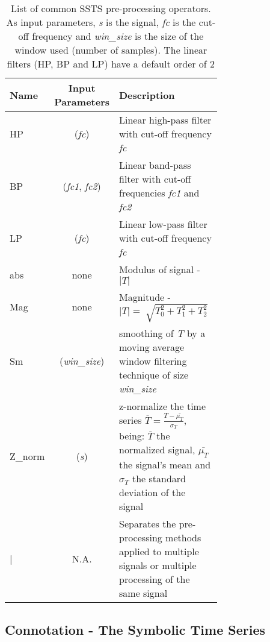 \begin{center}
\begin{table}
	\centering
    \setlength{\tabcolsep}{3pt}
	\renewcommand{\arraystretch}{1.5}
	\caption{List of common \gls{SSTS} pre-processing operators. As input parameters, \textit{s} is the signal, \textit{fc} is the cut-off frequency and \textit{win\_size} is the size of the window used (number of samples). The linear filters (HP, BP and LP) have a default order of 2}
	~\\~
	\label{tab:preprocess}
	\begin{tabular}{lcL{0.7\linewidth}}
        \toprule[0.5mm]
		Name & Input Parameters & Description\\
        \midrule[0.3mm]
		HP & (\textit{fc}) & Linear high-pass filter with cut-off frequency \textit{fc}\\
        \midrule
		BP & (\textit{fc1}, \textit{fc2}) & Linear band-pass filter with cut-off frequencies \textit{fc1} and \textit{fc2}\\ 
        \midrule
 		LP & (\textit{fc}) & Linear low-pass filter with cut-off frequency \textit{fc}\\
        \midrule
        abs & none & Modulus of signal - $|T|$\\
        \midrule
        Mag & none & Magnitude - $|T| = \sqrt[]{T_0^2 + T_1^2 + T_2^2}$\\
        \midrule
        Sm &  (\textit{win\_size}) & smoothing of \textit{T} by a moving average window filtering technique of size \textit{win\_size}\\
        \midrule
        Z_{norm} & (\textit{s}) & z-normalize the time series $\overline{T} = \frac{T-\bar{\mu_T}}{\sigma_T}$, being: $\overline{T}$ the normalized signal, $\bar{\mu_T}$ the signal's mean and $\sigma_T$ the standard deviation of the signal\\
        \midrule
        | & N.A. & Separates the pre-processing methods applied to multiple signals or multiple processing of the same signal\\
        \bottomrule[0.5mm]
 	\hline
	\end{tabular}
\end{table}
\end{center}

\subsection{Connotation - The Symbolic Time Series}
\label{subsec:symbolic_connotation}


